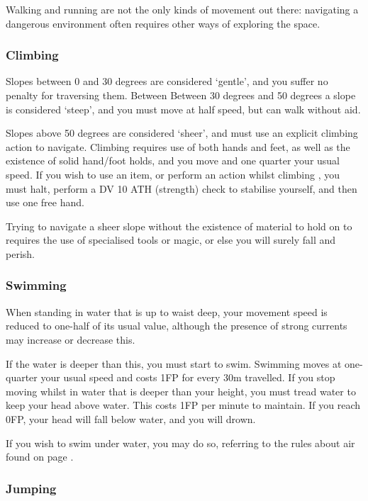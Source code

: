 Walking and running are not the only kinds of movement out there: navigating a dangerous environment often requires other ways of exploring the space. 

\subsubsection{Climbing}

Slopes between 0 and 30 degrees are considered `gentle', and you suffer no penalty for traversing them. Between  Between 30 degrees and 50 degrees a slope is considered `steep', and you must move at half speed, but can walk without aid. 

Slopes above 50 degrees are considered `sheer', and must use an explicit climbing action to navigate. Climbing requires use of both hands and feet, as well as the existence of solid hand/foot holds, and you move and one quarter your usual speed. If you wish to use an item, or perform an action whilst climbing , you must halt, perform a DV 10 ATH (strength) check to stabilise yourself, and then use one free hand. 

Trying to navigate a sheer slope without the existence of material to hold on to requires the use of specialised tools or magic, or else you will surely fall and perish. 

\subsubsection{Swimming}

When standing in water that is up to waist deep, your movement speed is reduced to one-half of its usual value, although the presence of strong currents may increase or decrease this. 

If the water is deeper than this, you must start to swim. Swimming moves at one-quarter your usual speed and costs 1FP for every 30m travelled. If you stop moving whilst in water that is deeper than your height, you must tread water to keep your head above water. This costs 1FP per minute to maintain. If you reach 0FP, your head will fall below water, and you will drown. 

If you wish to swim under water, you may do so, referring to the rules about air found on page \pageref{S:Air}. 

\subsubsection{Jumping}

